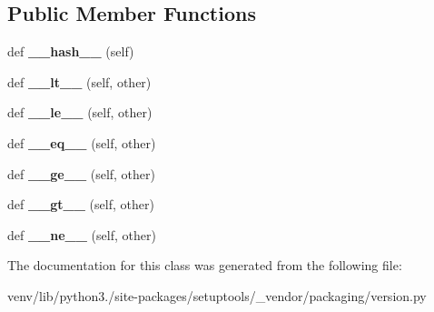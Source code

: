 \subsection*{Public Member Functions}
\begin{DoxyCompactItemize}
\item 
\mbox{\label{classsetuptools_1_1__vendor_1_1packaging_1_1version_1_1___base_version_a56134266800f740720c3209ea5284586}} 
def {\bfseries \+\_\+\+\_\+hash\+\_\+\+\_\+} (self)
\item 
\mbox{\label{classsetuptools_1_1__vendor_1_1packaging_1_1version_1_1___base_version_a6b30200919d1f89d2ab98607f1e5b3bf}} 
def {\bfseries \+\_\+\+\_\+lt\+\_\+\+\_\+} (self, other)
\item 
\mbox{\label{classsetuptools_1_1__vendor_1_1packaging_1_1version_1_1___base_version_a5cffa6a46c9d06cff6706bc814e8123e}} 
def {\bfseries \+\_\+\+\_\+le\+\_\+\+\_\+} (self, other)
\item 
\mbox{\label{classsetuptools_1_1__vendor_1_1packaging_1_1version_1_1___base_version_af48e2f9cb763dccb458a4d0b9a23f1a3}} 
def {\bfseries \+\_\+\+\_\+eq\+\_\+\+\_\+} (self, other)
\item 
\mbox{\label{classsetuptools_1_1__vendor_1_1packaging_1_1version_1_1___base_version_a1540bb23ab0a359c40020118eba60407}} 
def {\bfseries \+\_\+\+\_\+ge\+\_\+\+\_\+} (self, other)
\item 
\mbox{\label{classsetuptools_1_1__vendor_1_1packaging_1_1version_1_1___base_version_a177dc7a3808df42256904d188848b824}} 
def {\bfseries \+\_\+\+\_\+gt\+\_\+\+\_\+} (self, other)
\item 
\mbox{\label{classsetuptools_1_1__vendor_1_1packaging_1_1version_1_1___base_version_aff0afe8376f116afd936dc82be92a60e}} 
def {\bfseries \+\_\+\+\_\+ne\+\_\+\+\_\+} (self, other)
\end{DoxyCompactItemize}


The documentation for this class was generated from the following file\+:\begin{DoxyCompactItemize}
\item 
venv/lib/python3./site-\/packages/setuptools/\+\_\+vendor/packaging/version.\+py\end{DoxyCompactItemize}
